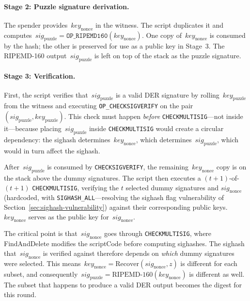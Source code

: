 \documentclass[11pt, a4paper]{article}
\begin{document}
\paragraph{Stage 2: Puzzle signature derivation.}
The spender provides~$\mathit{key}_{\mathrm{nonce}}$ in the witness. The script duplicates it and computes~$\mathit{sig}_{\mathrm{puzzle}} = \texttt{OP\_RIPEMD160}(\mathit{key}_{\mathrm{nonce}})$. One copy of~$\mathit{key}_{\mathrm{nonce}}$ is consumed by the hash; the other is preserved for use as a public key in Stage~3. The RIPEMD-160 output~$\mathit{sig}_{\mathrm{puzzle}}$ is left on top of the stack as the puzzle signature.

\paragraph{Stage 3: Verification.}
First, the script verifies that~$\mathit{sig}_{\mathrm{puzzle}}$ is a valid DER signature by rolling~$\mathit{key}_{\mathrm{puzzle}}$ from the witness and executing \texttt{OP\_CHECKSIGVERIFY} on the pair~$(\mathit{sig}_{\mathrm{puzzle}}, \mathit{key}_{\mathrm{puzzle}})$. This check must happen \emph{before} \texttt{CHECKMULTISIG}---not inside it---because placing~$\mathit{sig}_{\mathrm{puzzle}}$ inside \texttt{CHECKMULTISIG} would create a circular dependency: the sighash determines~$\mathit{key}_{\mathrm{nonce}}$, which determines~$\mathit{sig}_{\mathrm{puzzle}}$, which would in turn affect the sighash.

After~$\mathit{sig}_{\mathrm{puzzle}}$ is consumed by \texttt{CHECKSIGVERIFY}, the remaining~$\mathit{key}_{\mathrm{nonce}}$ copy is on the stack above the dummy signatures. The script then executes a $(t+1)$-of-$(t+1)$ \texttt{CHECKMULTISIG}, verifying the $t$ selected dummy signatures and $\mathit{sig}_{\mathrm{nonce}}$ (hardcoded, with \texttt{SIGHASH\_ALL}---resolving the sighash flag vulnerability of Section~\ref{sec:sighash-vulnerability}) against their corresponding public keys. $\mathit{key}_{\mathrm{nonce}}$ serves as the public key for~$\mathit{sig}_{\mathrm{nonce}}$.

The critical point is that~$\mathit{sig}_{\mathrm{nonce}}$ goes through \texttt{CHECKMULTISIG}, where FindAndDelete modifies the scriptCode before computing sighashes. The sighash that~$\mathit{sig}_{\mathrm{nonce}}$ is verified against therefore depends on \emph{which} dummy signatures were selected. This means~$\mathit{key}_{\mathrm{nonce}} = \text{Recover}(\mathit{sig}_{\mathrm{nonce}}, z)$ is different for each subset, and consequently~$\mathit{sig}_{\mathrm{puzzle}} = \text{RIPEMD-160}(\mathit{key}_{\mathrm{nonce}})$ is different as well. The subset that happens to produce a valid DER output becomes the digest for this round.
\end{document}
